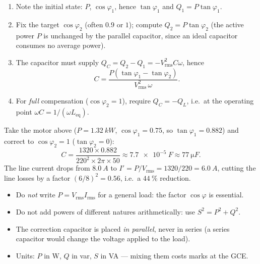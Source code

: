 \documentclass[11pt]{article}
\begin{document}
\begin{methode}
\begin{enumerate}
\item Note the initial state: $P$, $\cos\varphi_1$, hence $\tan\varphi_1$ and $Q_1 = P\tan\varphi_1$.
\item Fix the target $\cos\varphi_2$ (often $0.9$ or $1$); compute $Q_2 = P\tan\varphi_2$ (the active power $P$ is unchanged by the parallel capacitor, since an ideal capacitor consumes no average power).
\item The capacitor must supply $Q_C = Q_2 - Q_1 = -V_{\mathrm{rms}}^2 C\omega$, hence
\[
C = \frac{P\left(\tan\varphi_1 - \tan\varphi_2\right)}{V_{\mathrm{rms}}^2\,\omega}.
\]
\item For \emph{full} compensation ($\cos\varphi_2 = 1$), require $Q_C = -Q_L$, i.e.\ at the operating point $\omega C = 1/(\omega L_{\text{eq}})$.
\end{enumerate}
\end{methode}

\begin{exemplebox}
Take the motor above ($P = \SI{1.32}{kW}$, $\cos\varphi_1 = 0.75$, so $\tan\varphi_1 = 0.882$) and correct to $\cos\varphi_2 = 1$ ($\tan\varphi_2 = 0$):
\[
C = \frac{1320 \times 0.882}{220^2 \times 2\pi\times 50} \approx \SI{7.7e-5}{F} \approx \SI{77}{\micro F}.
\]
The line current drops from $\SI{8.0}{A}$ to $I' = P/V_{\mathrm{rms}} = 1320/220 = \SI{6.0}{A}$, cutting the line losses by a factor $(6/8)^2 = 0.56$, i.e.\ a $44\ \%$ reduction.
\end{exemplebox}

\begin{attention}
\begin{itemize}
\item Do \emph{not} write $P = V_{\mathrm{rms}}I_{\mathrm{rms}}$ for a general load: the factor $\cos\varphi$ is essential.
\item Do not add powers of different natures arithmetically: use $S^2 = P^2 + Q^2$.
\item The correction capacitor is placed \emph{in parallel}, never in series (a series capacitor would change the voltage applied to the load).
\item Units: $P$ in \si{W}, $Q$ in \si{var}, $S$ in \si{VA} — mixing them costs marks at the GCE.
\end{itemize}
\end{attention}
\end{document}
